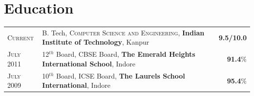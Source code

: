 \documentclass[a4paper]{article} %
\newcommand{\highlight}[2]{
    \begin{tabular}{p{2.4cm}|l}
        \textsc {\large #1} & #2
    \end{tabular}
}
\begin{document}
%
%


\section{Education}
\def\arraystretch{1.2}
\begin{tabular}{>{\raggedleft}p{1.5cm}p{15cm}r}

    \textsc{Current} & B. Tech, \textsc{Computer Science and Engineering},
    \textbf{Indian Institute of Technology}, Kanpur
    & \textbf{9.5/10.0}\\

    \textsc{July 2011} & 12$^{th}$ Board, \textsc{CBSE} Board,
    \textbf{The Emerald Heights International School}, Indore
    & \textbf{91.4}\% \\

    \textsc{July 2009} & 10$^{th}$ Board, \textsc{ICSE} Board,
    \textbf{The Laurels School International}, Indore
    & \textbf{95.4}\% \\

\end{tabular}
\def\arraystretch{1}

\end{document}
